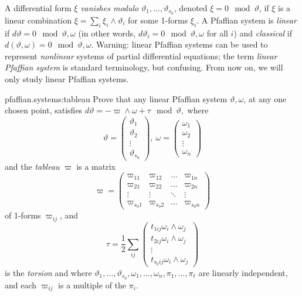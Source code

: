 A differential form \(\xi\) \emph{vanishes modulo} \(\vartheta_1,\dots,\vartheta_{s_0}\), denoted \(\xi = 0 \mod{\vartheta}\), if \(\xi\) is a linear combination \(\xi=\sum_i \xi_i \wedge \vartheta_i\) for some 1-forms \(\xi_i\).
A Pfaffian system is \emph{linear} if \(d\vartheta=0 \mod{\vartheta,\omega}\) (in other words, \(d\vartheta_i = 0 \mod{\vartheta,\omega}\) for all \(i\)) and \emph{classical} if \(d(\vartheta,\omega)=0 \mod{\vartheta,\omega}\).
Warning: linear Pfaffian systems can be used to represent \emph{nonlinear} systems of partial differential equations; the term \emph{linear Pfaffian system} is standard terminology, but confusing.
From now on, we will only study linear Pfaffian systems.
\begin{problem}{pfaffian.systems:tableau}
Prove that any linear Pfaffian system \(\vartheta,\omega\), at any one chosen point, satisfies
\(
d\vartheta = - \varpi \wedge \omega + \tau \mod{\vartheta},
\)
where
\[
\vartheta=
\begin{pmatrix}
\vartheta_1 \\
\vartheta_2 \\
\vdots \\
\vartheta_{s_0}
\end{pmatrix},  \ 
\omega
=
\begin{pmatrix}
\omega_1 \\
\omega_2 \\
\vdots \\
\omega_n
\end{pmatrix}
\]
and the \emph{tableau} \(\varpi\) is a matrix
\[
\varpi=
\begin{pmatrix}
\varpi_{11} & \varpi_{12} & \dots & \varpi_{1n} \\
\varpi_{21} & \varpi_{22} & \dots & \varpi_{2n} \\
\vdots & \vdots & \ddots & \vdots \\
\varpi_{s_0 1} & \varpi_{s_0 2} & \dots & \varpi_{s_0 n}
\end{pmatrix}
\]
of 1-forms \(\varpi_{ij}\), and
\[
\tau=
\frac{1}{2}\sum_{ij} 
\begin{pmatrix}
t_{1ij} \omega_i \wedge \omega_j \\
t_{2ij} \omega_i \wedge \omega_j \\
\vdots \\
t_{s_0 ij} \omega_i \wedge \omega_j 
\end{pmatrix}
\]
is the \emph{torsion} and where 
\(
\vartheta_1 , \dots , \vartheta_{s_0}, \omega_1, \dots , \omega_n,
\pi_1 , \dots , \pi_t
\)
are linearly independent, and each \(\varpi_{ij}\) is a multiple of the \(\pi_i\).
\end{problem}
